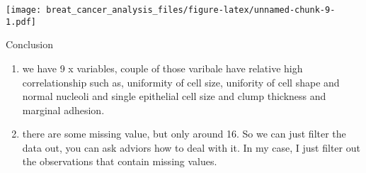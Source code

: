 \documentclass[]{article}
\newenvironment{Shaded}{\begin{snugshade}}{\end{snugshade}}
\newcommand{\ControlFlowTok}[1]{\textcolor[rgb]{0.13,0.29,0.53}{\textbf{#1}}}
\newcommand{\DataTypeTok}[1]{\textcolor[rgb]{0.13,0.29,0.53}{#1}}
\newcommand{\DecValTok}[1]{\textcolor[rgb]{0.00,0.00,0.81}{#1}}
\newcommand{\KeywordTok}[1]{\textcolor[rgb]{0.13,0.29,0.53}{\textbf{#1}}}
\newcommand{\NormalTok}[1]{#1}
\newcommand{\OperatorTok}[1]{\textcolor[rgb]{0.81,0.36,0.00}{\textbf{#1}}}
\newcommand{\StringTok}[1]{\textcolor[rgb]{0.31,0.60,0.02}{#1}}
\begin{document}
\begin{Shaded}
\end{Shaded}

\texttt{[image: breat\_cancer\_analysis\_files/figure-latex/unnamed-chunk-9-1.pdf]}

Conclusion

\begin{enumerate}
\def\labelenumi{\arabic{enumi}.}
\item
  we have 9 x variables, couple of those varibale have relative high
  correlationship such as, uniformity of cell size, unifority of cell
  shape and normal nucleoli and single epithelial cell size and clump
  thickness and marginal adhesion.
\item
  there are some missing value, but only around 16. So we can just
  filter the data out, you can ask adviors how to deal with it. In my
  case, I just filter out the observations that contain missing values.
\end{enumerate}
\end{document}
